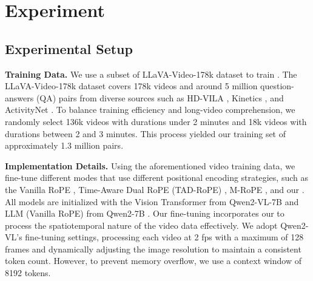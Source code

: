 \section{Experiment}



\subsection{Experimental Setup}


\noindent \textbf{Training Data.} We use a subset of LLaVA-Video-178k dataset \cite{zhang2024video} to train \methodname.
The LLaVA-Video-178k dataset covers 178k videos and around 5 million question-answers (QA) pairs from diverse sources such as HD-VILA \cite{xue2022hdvila}, Kinetics \cite{kay2017kinetics}, and ActivityNet \cite{caba2015activitynet}.
To balance training efficiency and long-video comprehension, we randomly select 136k videos with durations under 2 minutes and 18k videos with durations between 2 and 3 minutes.
This process yielded our training set of approximately 1.3 million pairs.

\noindent \textbf{Implementation Details.}
Using the aforementioned video training data, we fine-tune different modes that use different positional encoding strategies, such as the Vanilla RoPE \cite{su2024roformer}, Time-Aware Dual RoPE (TAD-RoPE) \cite{gao2024tc}, M-RoPE \cite{wang2024qwen2}, and our \methodname.
All models are initialized with the Vision Transformer from Qwen2-VL-7B and LLM (Vanilla RoPE) from Qwen2-7B \cite{yang2024qwen2}.
Our fine-tuning incorporates our \methodname to process the spatiotemporal nature of the video data effectively.
We adopt Qwen2-VL's fine-tuning settings, processing each video at 2 fps with a maximum of 128 frames and dynamically adjusting the image resolution to maintain a consistent token count. However, to prevent memory overflow, we use a context window of 8192 tokens.

